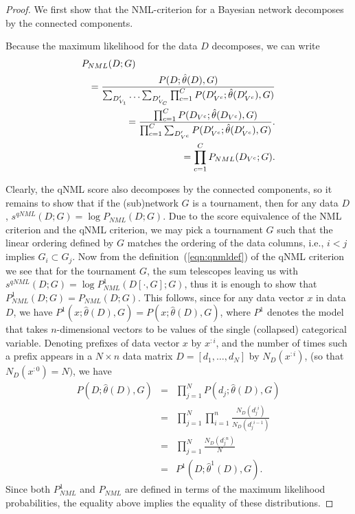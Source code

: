 \begin{proof}
We first show that the NML-criterion for a Bayesian network
decomposes by the connected components.

Because the maximum likelihood for the data $D$ decomposes,
we can write
\begin{eqnarray}
  \lefteqn{P_{NML}(D;G)} \nonumber \\
  && = \frac{P(D;\hat\theta(D),G)}
            {\sum_{D'_{V_1}}\ldots \sum_{D'_{V_C}}\prod_{c=1}^C P(D'_{V^c};\hat\theta(D'_{V^c}),G)} \nonumber \\
            && = \frac{\prod_{c=1}^C P(D_{V^c};\hat\theta(D_{V^c}),G)} 
            {\prod_{c=1}^C\sum_{D'_{V^c}}P(D'_{V^c};\hat\theta(D'_{V^c}),G)}.\nonumber \\
            && = \prod_{c=1}^CP_{NML}(D_{V^c};G).
\end{eqnarray}

Clearly, the qNML score also decomposes by the connected components,
so it remains to show that if the (sub)network $G$ is a tournament,
then for any data $D$, $s^{qNML}(D;G)=\log P_{NML}(D;G)$.  Due to the
score equivalence of the NML criterion and the qNML criterion, we may
pick a tournament $G$ such that the linear ordering defined by $G$ matches
the ordering of the data columns, i.e., $i<j$ implies $G_i \subset
G_j$. Now from the definition~(\ref{eqn:qnmldef}) of the qNML
criterion we see that for the tournament $G$, the sum telescopes
leaving us with $s^{qNML}(D;G) = \log P^1_{NML}(D[\cdot,G];G)$, thus
it is enough to show that $P^1_{NML}(D;G)=P_{NML}(D;G)$.  This
follows, since for any data vector $x$ in data $D$, we have
$P^1(x;\hat\theta(D),G) = P(x;\hat\theta(D),G)$, where $P^1$ denotes
the model that takes $n$-dimensional vectors to be values of the
single (collapsed) categorical variable.  Denoting prefixes of data
vector $x$ by $x^{:i}$, and the number of times such a prefix appears
in a $N\times n$ data matrix $D=[d_1,\ldots,d_N]$ by $N_D(x^{:i})$,
(so that $N_D(x^{:0})=N)$, we have
\begin{eqnarray}
  P(D;\hat\theta(D),G) &=& \prod_{j=1}^{N}P(d_j;\hat\theta(D),G) \nonumber \\
  &=& \prod_{j=1}^{N} \prod_{i=1}^{n} \frac{N_D(d_j^{:i})}{N_D(d_j^{:i-1})} \nonumber\\
  &=& \prod_{j=1}^{N} \frac{N_D(d_j^{:n})}{N} \nonumber \\
  &=& P^1(D;\hat\theta^1(D),G).
\end{eqnarray}
Since both $P^1_{NML}$ and $P_{NML}$ are defined in terms of the
maximum likelihood probabilities, the equality above implies the equality
of these distributions.
\end{proof}

